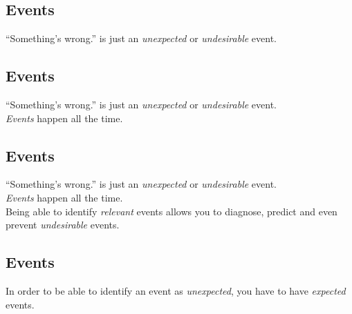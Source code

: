 \documentclass[xga]{xdvislides}
\begin{document}
\subsection{Events}
\vspace*{\fill}
\Huge
\begin{center}
``Something's wrong.'' is just an {\em unexpected} or
{\em undesirable} event.
\end{center}
\Normalsize
\vspace*{\fill}

\subsection{Events}
\vspace*{\fill}
\Huge
\begin{center}
``Something's wrong.'' is just an {\em unexpected} or
{\em undesirable} event. \\
\vspace{.4in}
{\em Events} happen all the time.
\end{center}
\Normalsize
\vspace*{\fill}

\subsection{Events}
\vspace*{\fill}
\Huge
\begin{center}
``Something's wrong.'' is just an {\em unexpected} or
{\em undesirable} event. \\
\vspace{.4in}
{\em Events} happen all the time. \\
\vspace{.4in}
Being able to identify {\em relevant} events allows
you to diagnose, predict and even prevent {\em
undesirable} events.
\end{center}
\Normalsize
\vspace*{\fill}

\subsection{Events}
\vspace*{\fill}
\Huge
\begin{center}
In order to be able to identify an event as {\em
unexpected}, you have to have {\em expected} events.
\end{center}
\Normalsize
\vspace*{\fill}
\end{document}
